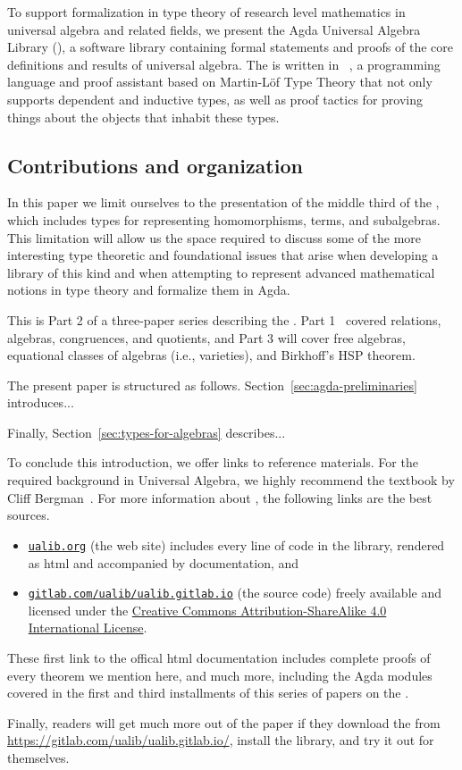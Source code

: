 To support formalization in type theory of research level mathematics in universal algebra and related fields, we present the Agda Universal Algebra Library (\agdaualib), a software library containing formal statements and proofs of the core definitions and results of universal algebra. 
The \ualib is written in \agda~\cite{Norell:2009}, a programming language and proof assistant based on Martin-L\"of Type Theory that not only supports dependent and inductive types, as well as proof tactics for proving things about the objects that inhabit these types.

\subsection{Contributions and organization}
\label{sec:contributions}

In this paper we limit ourselves to the presentation of the middle third of the \ualib, which includes types for representing homomorphisms, terms, and subalgebras. This limitation will allow us the space required to discuss some of the more interesting type theoretic and foundational issues that arise when developing a library of this kind and when attempting to represent advanced mathematical notions in type theory and formalize them in Agda.

This is Part 2 of a three-paper series describing the \agdaualib. Part 1~\cite{DeMeo:2021-1} covered relations, algebras, congruences, and quotients, and Part 3 will cover free algebras, equational classes of algebras (i.e., varieties), and Birkhoff's HSP theorem.

The present paper is structured as follows.
%
Section~\ref{sec:agda-preliminaries} introduces...

Finally, Section~\ref{sec:types-for-algebras} describes...
%

To conclude this introduction, we offer links to reference materials.  For the required background in Universal Algebra, we highly recommend the textbook by Cliff Bergman~\cite{Bergman:2012}.  For more information about \agdaualib, the following links are the best sources.
\begin{itemize}
  \item \href{https://ualib.gitlab.io}{\texttt{ualib.org}} (the web site) includes every line of code in the library, rendered as html and accompanied by documentation, and
  \item \href{https://gitlab.com/ualib/ualib.gitlab.io}{\texttt{gitlab.com/ualib/ualib.gitlab.io}} (the source code) freely available and licensed under the \href{https://creativecommons.org/licenses/by-sa/4.0/}{Creative Commons Attribution-ShareAlike 4.0 International License}.
\end{itemize}
These first link to the offical \ualib html documentation includes complete proofs of every theorem we mention here, and much more, including the Agda modules covered in the first and third installments of this series of papers on the \ualib.

Finally, readers will get much more out of the paper if they download the \ualib from \url{https://gitlab.com/ualib/ualib.gitlab.io/}, install the library, and try it out for themselves.
